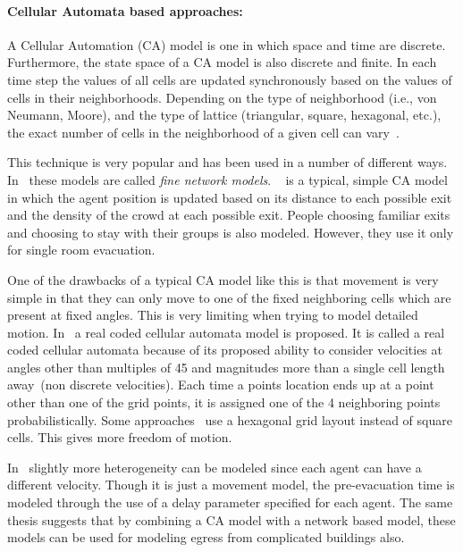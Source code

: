\paragraph{Cellular Automata based approaches:}
 
 A Cellular Automation (CA) model is one in which space and time are discrete. Furthermore, the state space of a CA model is also discrete and finite. In each time step the values of all cells are updated synchronously based on the values of cells in their neighborhoods. Depending on the type of neighborhood (i.e., von Neumann, Moore), and the type of lattice (triangular, square, hexagonal, etc.), the exact number of cells in the neighborhood of a given cell can vary~\cite{Hoekstra:2010}. 

 This technique is very popular and has been used in a number of different ways. In~\cite{Gwynne:1999vi,Kuligowski:2005tt} these models are called \emph{fine network models}.
~\cite{Yuan:2007ja} is a typical, simple CA model in which the agent position is updated based on its distance to each possible exit and the density of the crowd at each possible exit. People choosing familiar exits and choosing to stay with their groups is also modeled. However, they use it only for single room evacuation.

One of the drawbacks of a typical CA model like this is that movement is very simple in that they can only move to one of the fixed neighboring cells which are present at fixed angles. This is very limiting when trying to model detailed motion. In~\cite{Yamamoto:2007dc} a real coded cellular automata model is proposed. It is called a real coded cellular automata because of its proposed ability to consider velocities at angles other than multiples of 45 and magnitudes more than a single cell length away~(non discrete velocities). Each time a points location ends up at a point other than one of the grid points, it is assigned one of the 4 neighboring points probabilistically. Some approaches~\cite{Klein:2009} use a hexagonal grid layout instead of square cells. This gives more freedom of motion.

In~\cite{Klupfel:2003wa} slightly more heterogeneity can be modeled since each agent can have a different velocity. Though it is just a movement model, the pre-evacuation time is modeled through the use of a delay parameter specified for each agent. The same thesis suggests that by combining a CA model with a network based model, these models can be used for modeling egress from complicated buildings also.

